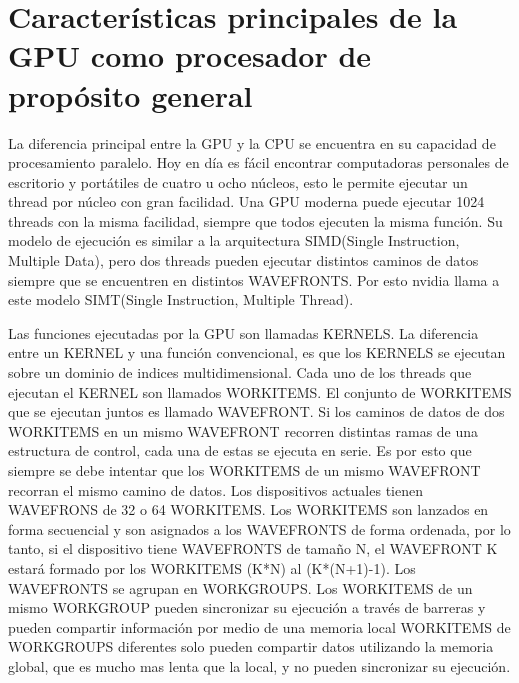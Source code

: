 
\chapter{Características principales de la GPU como procesador de propósito
general}

La diferencia principal entre la GPU y la CPU se encuentra en su capacidad de
procesamiento paralelo. Hoy en día es fácil encontrar computadoras personales de
escritorio y portátiles de cuatro u ocho núcleos, esto le permite ejecutar un
thread por núcleo con gran facilidad. Una GPU moderna puede ejecutar 1024
threads con la misma facilidad, siempre que todos ejecuten la misma función. Su
modelo de ejecución es similar a la arquitectura SIMD(Single Instruction,
Multiple Data), pero dos threads pueden ejecutar distintos caminos de datos
siempre que se encuentren en distintos WAVEFRONTS. Por esto nvidia llama a este
modelo SIMT(Single Instruction, Multiple Thread).

Las funciones ejecutadas por la GPU son llamadas KERNELS. La diferencia entre un
KERNEL y una función convencional, es que los KERNELS se ejecutan sobre un
dominio de indices multidimensional. Cada uno de los threads que ejecutan el
KERNEL son llamados WORKITEMS. El conjunto de WORKITEMS que se ejecutan juntos
es llamado WAVEFRONT. Si los caminos de datos de dos WORKITEMS en un mismo
WAVEFRONT recorren distintas ramas de una estructura de control, cada una de
estas se ejecuta en serie. Es por esto que siempre se debe intentar que los
WORKITEMS de un mismo WAVEFRONT recorran el mismo camino de datos. Los
dispositivos actuales tienen WAVEFRONS de 32 o 64 WORKITEMS. Los WORKITEMS son
lanzados en forma secuencial y son asignados a los WAVEFRONTS de forma ordenada,
por lo tanto, si el dispositivo tiene WAVEFRONTS de tamaño N, el WAVEFRONT K
estará formado por los WORKITEMS (K*N) al (K*(N+1)-1). Los WAVEFRONTS se agrupan
en WORKGROUPS. Los WORKITEMS de un mismo WORKGROUP pueden sincronizar su
ejecución a través de barreras y pueden compartir información por medio de una
memoria local WORKITEMS de WORKGROUPS diferentes solo pueden compartir datos
utilizando la memoria global, que es mucho mas lenta que la local, y no pueden
sincronizar su ejecución.

